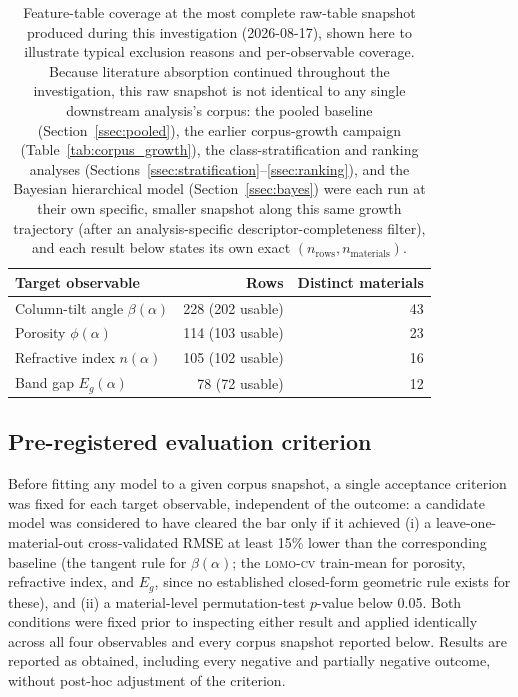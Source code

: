 \documentclass[aip,amsmath,amssymb,reprint]{revtex4-1}
\newcommand{\lomo}{\textsc{lomo-cv}}
\begin{document}
\begin{table}[htbp]
  \centering
  \caption{Feature-table coverage at the most complete raw-table
    snapshot produced during this investigation (2026-08-17), shown
    here to illustrate typical exclusion reasons and per-observable
    coverage. Because literature absorption continued throughout the
    investigation, this raw snapshot is not identical to any single
    downstream analysis's corpus: the pooled baseline
    (Section~\ref{ssec:pooled}), the earlier corpus-growth campaign
    (Table~\ref{tab:corpus_growth}), the class-stratification and
    ranking analyses (Sections~\ref{ssec:stratification}--\ref{ssec:ranking}),
    and the Bayesian hierarchical model (Section~\ref{ssec:bayes}) were
    each run at their own specific, smaller snapshot along this same
    growth trajectory (after an analysis-specific descriptor-completeness
    filter), and each result below states its own exact
    $(n_{\mathrm{rows}}, n_{\mathrm{materials}})$.}
  \label{tab:coverage}
  \begin{tabular}{lrr}
    \toprule
    Target observable & Rows & Distinct materials \\
    \midrule
    Column-tilt angle $\beta(\alpha)$ & 228 (202 usable) & 43 \\
    Porosity $\phi(\alpha)$ & 114 (103 usable) & 23 \\
    Refractive index $n(\alpha)$ & 105 (102 usable) & 16 \\
    Band gap $E_g(\alpha)$ & 78 (72 usable) & 12 \\
    \bottomrule
  \end{tabular}
\end{table}

\subsection{Pre-registered evaluation criterion}
\label{ssec:preregistration}

Before fitting any model to a given corpus snapshot, a single
acceptance criterion was fixed for each target observable,
independent of the outcome: a candidate model was considered to have
cleared the bar only if it achieved (i) a leave-one-material-out
cross-validated RMSE at least 15\% lower than the corresponding
baseline (the tangent rule for $\beta(\alpha)$; the \lomo{} train-mean
for porosity, refractive index, and $E_g$, since no established
closed-form geometric rule exists for these), and (ii) a
material-level permutation-test $p$-value below 0.05. Both conditions
were fixed prior to inspecting either result and applied identically
across all four observables and every corpus snapshot reported below.
Results are reported as obtained, including every negative and
partially negative outcome, without post-hoc adjustment of the
criterion.
\end{document}
